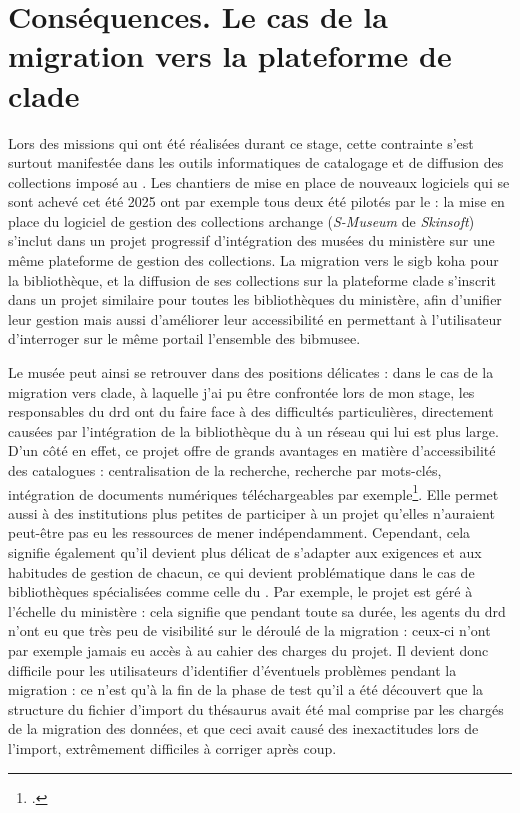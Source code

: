 \section{\label{I-B-2}Conséquences. Le cas de la migration vers la plateforme de \gls{clade}}

Lors des missions qui ont été réalisées durant ce stage, cette contrainte s'est surtout manifestée dans les outils informatiques de catalogage et de diffusion des collections imposé au \mae. Les chantiers de mise en place de nouveaux logiciels qui se sont achevé cet été 2025 ont par exemple tous deux été pilotés par le \minarm : la mise en place du logiciel de gestion des collections \gls{archange} (\textit{S-Museum} de \textit{Skinsoft}) s'inclut dans un projet progressif d'intégration des musées du ministère sur une même plateforme de gestion des collections. La migration vers le \ac{sigb} \gls{koha} pour la bibliothèque, et la diffusion de ses collections sur la plateforme \gls{clade} s'inscrit dans un projet similaire pour toutes les bibliothèques du ministère, afin d'unifier leur gestion mais aussi d'améliorer leur accessibilité en permettant à l'utilisateur d'interroger sur le même portail l'ensemble des \gls{bibmusee}.

Le musée peut ainsi se retrouver dans des positions délicates : dans le cas de la migration vers \gls{clade}, à laquelle j'ai pu être confrontée lors de mon stage, les responsables du \ac{drd} ont du faire face à des difficultés particulières, directement causées par l'intégration de la bibliothèque du \mae à un réseau qui lui est plus large. D'un côté en effet, ce projet offre de grands avantages en matière d'accessibilité des catalogues : centralisation de la recherche, recherche par mots-clés, intégration de documents numériques téléchargeables par exemple\footcite{ministeredesarmeesKitCommunicationCLADE}. Elle permet aussi à des institutions plus petites de participer à un projet qu'elles n'auraient peut-être pas eu les ressources de mener indépendamment. Cependant, cela signifie également qu'il devient plus délicat de s'adapter aux exigences et aux habitudes de gestion de chacun, ce qui devient problématique dans le cas de bibliothèques spécialisées comme celle du \mae. Par exemple, le projet est géré à l'échelle du ministère : cela signifie que pendant toute sa durée, les agents du \ac{drd} n'ont eu que très peu de visibilité sur le déroulé de la migration : ceux-ci n'ont par exemple jamais eu accès à au cahier des charges du projet. Il devient donc difficile pour les utilisateurs d'identifier d'éventuels problèmes pendant la migration : ce n'est qu'à la fin de la phase de test qu'il a été découvert que la structure du fichier d'import du thésaurus avait été mal comprise par les chargés de la migration des données, et que ceci avait causé des inexactitudes lors de l'import, extrêmement difficiles à corriger après coup.

